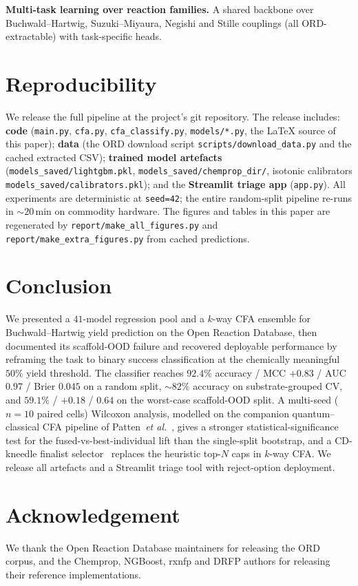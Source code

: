 \documentclass[conference]{IEEEtran}
\begin{document}
\textbf{Multi-task learning over reaction families.}
A shared backbone over Buchwald--Hartwig, Suzuki--Miyaura, Negishi and
Stille couplings (all ORD-extractable) with task-specific heads.

\section{Reproducibility}
\label{sec:repro}
We release the full pipeline at the project's git repository. The release
includes: \textbf{code} (\texttt{main.py}, \texttt{cfa.py},
\texttt{cfa\_classify.py}, \texttt{models/*.py}, the LaTeX source of this
paper); \textbf{data} (the ORD download script
\texttt{scripts/download\_data.py} and the cached extracted CSV);
\textbf{trained model artefacts}
(\texttt{models\_saved/lightgbm.pkl}, \texttt{models\_saved/chemprop\_dir/},
isotonic calibrators \texttt{models\_saved/calibrators.pkl}); and the
\textbf{Streamlit triage app} (\texttt{app.py}). All experiments are
deterministic at \texttt{seed=42}; the entire random-split pipeline
re-runs in $\sim$$20$\,min on commodity hardware. The figures and tables
in this paper are regenerated by
\texttt{report/make\_all\_figures.py} and
\texttt{report/make\_extra\_figures.py} from cached predictions.

\section{Conclusion}
\label{sec:conclusion}
We presented a $41$-model regression pool and a $k$-way CFA ensemble for
Buchwald--Hartwig yield prediction on the Open Reaction Database, then
documented its scaffold-OOD failure and recovered deployable performance
by reframing the task to binary success classification at the chemically
meaningful $50\%$ yield threshold. The classifier reaches $92.4\%$
accuracy / MCC $+0.83$ / AUC $0.97$ / Brier $0.045$ on a random split,
$\sim$$82\%$ accuracy on substrate-grouped CV, and $59.1\%$ / $+0.18$ /
$0.64$ on the worst-case scaffold-OOD split. A multi-seed
($n\!=\!10$ paired cells) Wilcoxon analysis, modelled on the companion
quantum--classical CFA pipeline of
Patten~\textit{et al.}~\cite{Patten2026Quantum}, gives a stronger
statistical-significance test for the fused-vs-best-individual lift than
the single-split bootstrap, and a CD-kneedle finalist
selector~\cite{Satopaa2011Knee} replaces the heuristic top-$N$ caps in
$k$-way CFA. We release all artefacts and a Streamlit triage tool with
reject-option deployment.

\section*{Acknowledgement}
We thank the Open Reaction Database maintainers for releasing the ORD
corpus, and the Chemprop, NGBoost, rxnfp and DRFP authors for releasing
their reference implementations.



\end{document}
